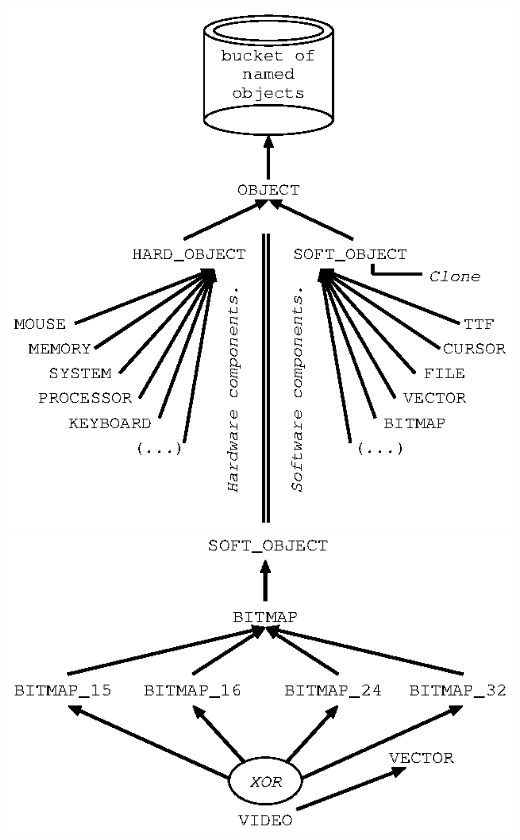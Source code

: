 \documentclass[11pt]{mybook}
\begin{document}
\begin{center}
\includegraphics[scale=1.0]{figures/design0}
\includegraphics[scale=1.0]{figures/design1}

\end{center}
\end{document}
